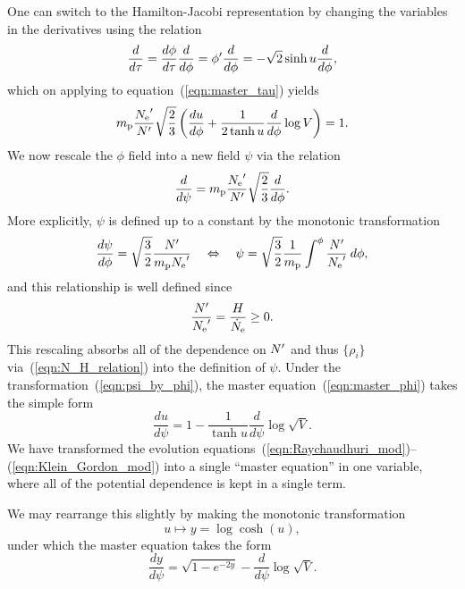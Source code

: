 One can switch to the Hamilton-Jacobi representation by changing the variables in the derivatives using the relation 
%
\begin{equation}
  \frac{d }{d \tau}
  =
  \frac{d \phi}{d \tau}\frac{d }{d \phi}
  =
  {{\phi}^\prime}\frac{d }{d \phi}
  =
  -\sqrt{2}\sinh u \frac{d }{d \phi},
  \label{eqn:tautrans}
\end{equation}
%
which on applying to equation~(\ref{eqn:master_tau}) yields
%
\begin{equation}
  m_{\mathrm{p}}\frac{{{N_\mathrm{e}}^\prime}}{{{N}^\prime}} \sqrt{\frac{2}{3}}
  \left(\frac{du}{d\phi} 
  + \frac{1}{2\tanh u} \frac{d}{d\phi}\log V\right) 
  = 
  1.
  \label{eqn:master_phi}
\end{equation}
%
We now  rescale the $\phi$ field into a new field $\psi$ via the relation
%
\begin{equation}
  \frac{d}{d\psi} 
  = 
  m_{\mathrm{p}}\frac{{{N_\mathrm{e}}^\prime}}{{{N}^\prime}}\sqrt{\frac{2}{3}}\frac{d}{d\phi}.
\end{equation}
%
More explicitly, $\psi$ is defined up to a constant by the monotonic transformation
%
\begin{equation}
  \frac{d\psi}{d\phi} 
  = 
  \sqrt{\frac{3}{2}}\frac{{{N}^\prime}}{m_{\mathrm{p}}{{N_\mathrm{e}}^\prime}} 
  \quad
  \Leftrightarrow\quad \psi 
  = 
  \sqrt{\frac{3}{2}}\frac{1}{m_{\mathrm{p}}}\int^\phi 
  \frac{{{N}^\prime}}{{{N_\mathrm{e}}^\prime}}\:d\phi,
  \label{eqn:psi_by_phi}
\end{equation}
%
and this relationship is well defined since 
%
\begin{equation}
	\frac{{{N}^\prime}}{{{N_\mathrm{e}}^\prime}} = \frac{H}{\dot{N}_\mathrm{e}} \ge 0.
\end{equation}
%
This rescaling absorbs all of the dependence on ${{N}^\prime}$ and thus $\{\rho_i\}$ via~(\ref{eqn:N_H_relation}) into the definition of $\psi$. Under the transformation~(\ref{eqn:psi_by_phi}), the master equation~(\ref{eqn:master_phi}) takes the simple form
%
\begin{equation}
  \frac{du}{d\psi}  
  = 
  1-\frac{1}{\tanh u} \frac{d}{d\psi}\log \sqrt V.
\end{equation}
%
We have transformed the evolution equations~(\ref{eqn:Raychaudhuri_mod})--(\ref{eqn:Klein_Gordon_mod}) into a single ``master equation'' in one variable, where all of the potential dependence is kept in a single term.

We may rearrange this slightly by making the monotonic transformation
%
\begin{equation}
  u\mapsto y = \log\cosh(u), 
  \label{eqn:y_def}
\end{equation}
%
under which the master equation takes the form
%
\begin{equation}
  \frac{dy}{d\psi} = \sqrt{1-e^{-2y}} - \frac{d}{d\psi}\log \sqrt V.
  \label{eqn:master_eq}
\end{equation}
%

